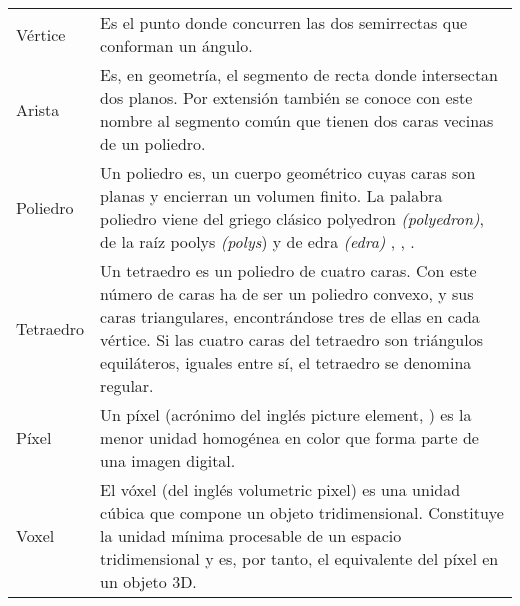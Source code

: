 \begin{table}[h!t]
	\begin{tabular}{lp{11cm}}
	Vértice   & Es el punto donde concurren las dos semirrectas que conforman un ángulo.\\

	Arista    & Es, en geometría, el segmento de recta donde intersectan dos planos. Por extensión también se conoce con este
			nombre al segmento común que tienen dos caras vecinas de un poliedro.\\

	Poliedro  & Un poliedro es, un cuerpo geométrico cuyas caras son planas y encierran un volumen finito. La palabra poliedro
			viene del griego clásico \textgreek{polyedron} \emph{(polyedron)}, de la raíz \textgreek{poolys} \emph{(polys})
			\jcq{muchas} y de \textgreek{edra} \emph{(edra)} \jcq{base}, \jcq{asiento}, \jcq{cara}.\\

	Tetraedro & Un tetraedro es un poliedro de cuatro caras. Con este número de caras ha de ser un
			poliedro convexo, y sus caras triangulares, encontrándose tres de ellas en cada vértice. Si las
			cuatro caras del tetraedro son triángulos equiláteros, iguales entre sí, el tetraedro se denomina
			regular.\\

	Píxel     & Un píxel (acrónimo del inglés picture element, \jcq{elemento de imagen}) es la menor unidad homogénea en color
			que forma parte de una imagen digital.\\

	Voxel     & El vóxel (del inglés volumetric pixel) es una unidad cúbica que compone un objeto
			tridimensional. Constituye la unidad mínima procesable de un espacio tridimensional y es, por
			tanto, el equivalente del píxel en un objeto 3D.\\
	\end{tabular}
\end{table}
